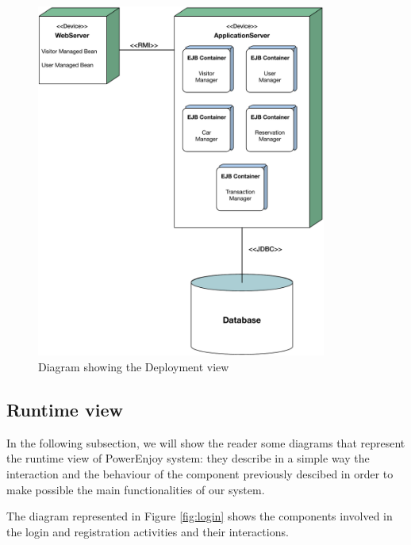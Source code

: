 \begin{figure}[htbp]
\centering
\vspace{12pt}
\includegraphics[width=0.85\textwidth]{Images/Deployment.pdf}
\vspace{10pt}
\caption{Diagram showing the Deployment view}
\label{fig:deployment}
\end{figure}
\clearpage

\subsection{Runtime view} \label{run-view}

In the following subsection, we will show the reader some diagrams that  represent the runtime view of PowerEnjoy system: they describe in a simple way the interaction and the behaviour of the component previously descibed in order to make possible the main functionalities of our system.

\newline
The diagram represented in Figure \ref{fig:login} shows the components involved in the login and registration activities and their interactions.

